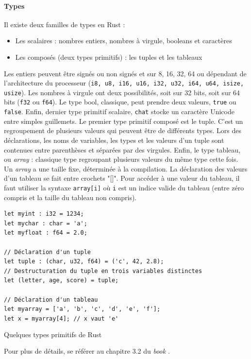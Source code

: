\documentclass[a4paper, 12pt]{article}
\newenvironment{code}{\captionsetup{type=listing}}{}
\begin{document}
\paragraph{Types}
Il existe deux familles de types en Rust : 
\begin{itemize}
    \item Les scalaires : nombres entiers, nombres à virgule, booleans et caractères
    \item Les composés (deux types primitifs) : les tuples et les tableaux
\end{itemize}
Les entiers peuvent être signés ou non signés et sur 8, 16, 32, 64 ou dépendant de l'architecture
du processeur (\texttt{i8, u8, i16, u16, i32, u32, i64, u64, isize, usize}). Les nombres 
à virgule ont deux possibilités, soit sur 32 bits, soit sur 64 bits (\texttt{f32} ou 
\texttt{f64}). Le type bool, classique, peut prendre deux valeurs, \texttt{true} 
ou \texttt{false}. Enfin, dernier type primitif scalaire, \texttt{chat} stocke 
un caractère Unicode entre simples guillemets. Le premier type primitif composé est le tuple. C'est 
un regroupement de plusieurs valeurs qui peuvent être de différents types. Lors des déclarations, 
les noms de variables, les types et les valeurs d'un tuple sont contenues entre parenthèses et 
séparées par des virgules. Enfin, le type tableau, ou \textit{array} : classique type regroupant 
plusieurs valeurs du même type cette fois. Un \textit{array} a une taille fixe, déterminée à la 
compilation. La déclaration des valeurs d'un tableau se fait entre crochets "[]". Pour accéder à une 
valeur du tableau, il faut utiliser la syntaxe \texttt{array[i]} où \texttt{i} 
est un indice valide du tableau (entre zéro compris et la taille du tableau non compris).
\bigbreak
\begin{code}
    \begin{verbatim}
let myint : i32 = 1234;
let mychar : char = 'a';
let myfloat : f64 = 2.0;

// Déclaration d'un tuple
let tuple : (char, u32, f64) = ('c', 42, 2.8);
// Destructuration du tuple en trois variables distinctes
let (letter, age, score) = tuple;

// Déclaration d'un tableau
let myarray = ['a', 'b', 'c', 'd', 'e', 'f'];
let x = myarray[4]; // x vaut 'e'
    \end{verbatim}
    \caption{Quelques types primitifs de Rust}
    \label{rust_types}
\end{code}
\bigbreak
Pour plus de détails, se référer au chapitre 3.2 du \textit{book} \cite{ref0}.
\end{document}
